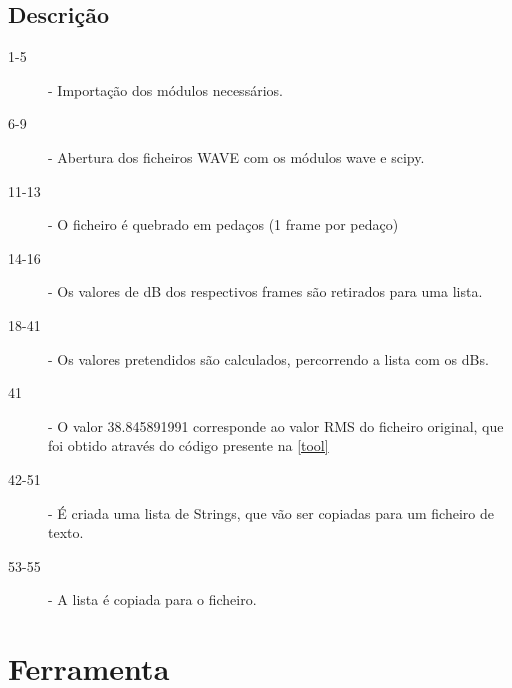 \documentclass[a4paper]{report}
\begin{document}
\section{Descrição}
\label{description}
\begin{description}
\item[1-5] - Importação dos módulos necessários.
\item[6-9] - Abertura dos ficheiros WAVE com os módulos wave e scipy.
\item[11-13] - O ficheiro é quebrado em pedaços (1 frame por pedaço)
\item[14-16] - Os valores de dB dos respectivos frames são retirados para uma lista.
\item[18-41] - Os valores pretendidos são calculados, percorrendo a lista com os dBs.
\item[41] - O valor 38.845891991 corresponde ao valor RMS do ficheiro original, que foi obtido através do código presente na \autoref{tool}
\item[42-51] - É criada uma lista de Strings, que vão ser copiadas para um ficheiro de texto.
\item[53-55] - A lista é copiada para o ficheiro.

\end{description}

\chapter{Ferramenta}
\label{tool}

\end{document}
